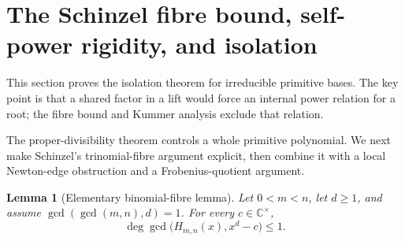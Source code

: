 \documentclass[11pt]{article}
\numberwithin{equation}{section}
\newtheorem{lemma}[theorem]{Lemma}
\theoremstyle{definition}
\newcommand{\C}{\mathbb C}
\begin{document}
\section{The Schinzel fibre bound, self-power rigidity, and isolation}

This section proves the isolation theorem for irreducible primitive bases.  The key point is that a shared factor in a lift would force an internal power relation for a root; the fibre bound and Kummer analysis exclude that relation.
\label{sec:kummer}

The proper-divisibility theorem controls a whole primitive polynomial.  We
next make Schinzel's trinomial-fibre argument explicit, then combine it with a
local Newton-edge obstruction and a Frobenius-quotient argument.

\begin{lemma}[Elementary binomial-fibre lemma]\label{lem:schinzelfibre}
Let \(0<m<n\), let \(d\geq1\), and assume
\(\gcd(\gcd(m,n),d)=1\).  For every \(c\in\C^\times\),
\[
 \deg\gcd\bigl(H_{m,n}(x),x^d-c\bigr)\leq1.
\]
\end{lemma}
\end{document}
